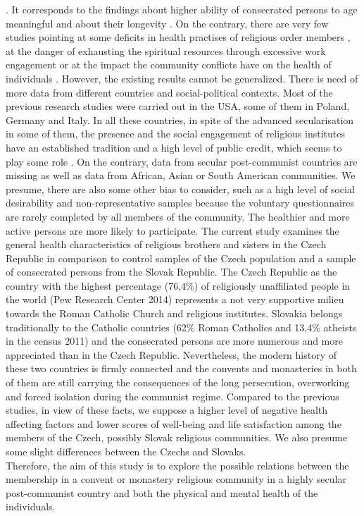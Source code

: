 \documentclass[ijerph,article,accept,moreauthors,pdftex]{mdpi}
\begin{document}
\citep{keohane2019nun, schott2019stability}. It corresponds to the
findings about higher ability of consecrated persons to age meaningful
\citep{corwin2020care} and about their longevity
\citep{weinstein2019autonomous, danner2001positive}. On the contrary,
there are very few studies pointing at some deficits in health practises
of religious order members \citep{meurer1990exploratory}, at the danger
of exhausting the spiritual resources through excessive work engagement
\citep{bickerton2013spiritual} or at the impact the community conflicts
have on the health of individuals \citep{bowen2018community}. However,
the existing results cannot be generalized. There is need of more data
from different countries and social-political contexts. Most of the
previous research studies were carried out in the USA, some of them in
Poland, Germany and Italy. In all these countries, in spite of the
advanced secularisation in some of them, the presence and the social
engagement of religious institutes have an established tradition and a
high level of public credit, which seems to play some role
\citep{rogowska2020investigating}. On the contrary, data from secular
post-communist countries are missing as well as data from African, Asian
or South American communities. We presume, there are also some other
bias to consider, such as a high level of social desirability and
non-representative samples because the voluntary questionnaires are
rarely completed by all members of the community. The healthier and more
active persons are more likely to participate. The current study
examines the general health characteristics of religious brothers and
sisters in the Czech Republic in comparison to control samples of the
Czech population and a sample of consecrated persons from the Slovak
Republic. The Czech Republic as the country with the highest percentage
(76,4\%) of religiously unaffiliated people in the world (Pew Research
Center 2014) represents a not very supportive milieu towards the Roman
Catholic Church and religious institutes. Slovakia belongs traditionally
to the Catholic countries (62\% Roman Catholics and 13,4\% atheists in
the census 2011) and the consecrated persons are more numerous and more
appreciated than in the Czech Republic. Nevertheless, the modern history
of these two countries is firmly connected and the convents and
monasteries in both of them are still carrying the consequences of the
long persecution, overworking and forced isolation during the communist
regime. Compared to the previous studies, in view of these facts, we
suppose a higher level of negative health affecting factors and lower
scores of well-being and life satisfaction among the members of the
Czech, possibly Slovak religious communities. We also presume some
slight differences between the Czechs and Slovaks.\\
Therefore, the aim of this study is to explore the possible relations
between the membership in a convent or monastery religious community in
a highly secular post-communist country and both the physical and mental
health of the individuals.
\end{document}
